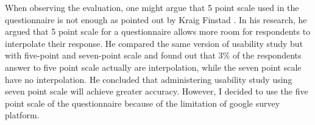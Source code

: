 When observing the evaluation, one might argue that 5 point scale used in the questionnaire is not enough as pointed out by Kraig Finstad \cite{finstad2010response}. In his research, he argued that 5 point scale for a questionnaire allows more room for respondents to interpolate their response. He compared the same version of usability study but with five-point and seven-point scale and found out that 3\% of the respondents answer to five point scale actually are interpolation, while the seven point scale have no interpolation. He concluded that administering usability study using seven point scale will achieve greater accuracy. However, I decided to use the five point scale of the questionnaire because of the limitation of google survey platform. 

\noindent%
\begin{minipage}{\linewidth}%
 \label{fig:google-limit}%
\end{minipage}


